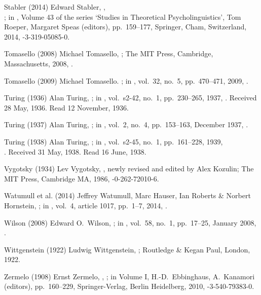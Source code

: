 \biblabel Stabler (2014)
Edward Stabler,
,\\
;
in ,
Volume 43 of the series ‘Studies in Theoretical Psycholinguistics’,
Tom Roeper, Margaret Speas (editors),
pp.\ 159--177,
Springer, Cham, Switzerland, 2014,
-3-319-05085-0.

\biblabel Tomasello (2008)
Michael Tomasello,
;
The MIT Press, Cambridge, Massachusetts, 2008,
.

\biblabel Tomasello (2009)
Michael Tomasello.
;
in ,
vol.\ 32, no.\ 5, pp.\ 470--471, 2009,
.

\biblabel Turing (1936)
Alan Turing,
;
in ,
vol.\ s2-42, no.\ 1, pp.\ 230--265, 1937,
.
Received 28 May, 1936. Read 12 November, 1936.

\biblabel Turing (1937)
Alan Turing,
; in
,
vol.\ 2, no.\ 4, pp.\ 153--163, December 1937,
.

\biblabel Turing (1938)
Alan Turing,
;
in ,
vol.\ s2-45, no.\ 1, pp.\ 161--228, 1939,\\
.
Received 31 May, 1938. Read 16 June, 1938.

\biblabel Vygotsky (1934)
Lev Vygotsky,
,
newly revised and edited by Alex Kozulin;
The MIT Press, Cambridge MA, 1986,
-0-262-72010-6.

\biblabel Watumull et al. (2014)
Jeffrey Watumull, Marc Hauser, Ian Roberts \& Norbert Hornstein,
; in
,
vol.\ 4, article 1017, pp.\ 1--7, 2014,
.

\biblabel Wilson (2008)
Edward O.\ Wilson,
;
in ,
vol.\ 58, no.\ 1, pp.\ 17--25, January 2008,
.

\biblabel Wittgenstein (1922)
Ludwig Wittgenstein,
;
Routledge \& Kegan Paul, London, 1922.

\biblabel Zermelo (1908)
Ernst Zermelo,
,
;
in  Volume I,
H.-D.\ Ebbinghaus, A.\ Kanamori (editors),
pp.\ 160--229,
Springer-Verlag, Berlin Heidelberg, 2010,
-3-540-79383-0.

\endinput
